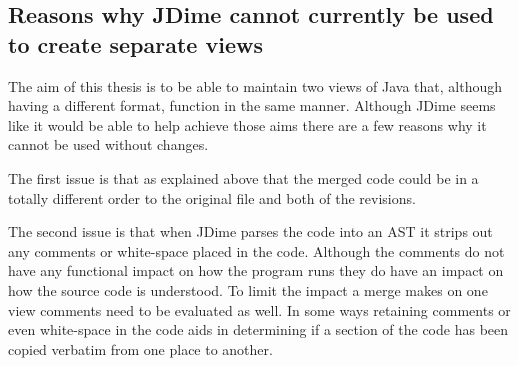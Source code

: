 \subsection{Reasons why JDime cannot currently be used to create separate views}
The aim of this thesis is to be able to maintain two views of Java that, although having a different format, function in the same manner.  Although JDime seems like it would be able to help achieve those aims there are a few reasons why it cannot be used without changes.

The first issue is that as explained above that the merged code could be in a totally different order to the original file and both of the revisions.

The second issue is that when JDime parses the code into an AST it strips out any comments or white-space placed in the code.  Although the comments do not have any functional impact on how the program runs they do have an impact on how the source code is understood.  To limit the impact a merge makes on one view comments need to be evaluated as well. In some ways retaining comments or even white-space in the code aids in determining if a section of the code has been copied verbatim from one place to another.


% 
% 
% 

